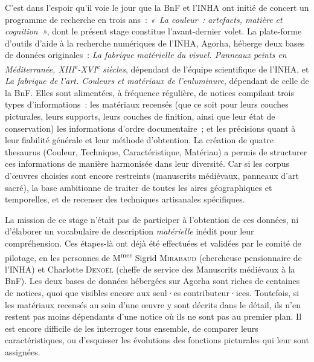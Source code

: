 \documentclass[a4paper,12pt, twoside]{book}
\begin{document}
C’est dans l’espoir qu’il voie le jour que la BnF et l’INHA ont initié de concert un programme de recherche en trois ans~: \textit{«~La couleur~: artefacts, matière et cognition~»}, dont le présent stage constitue l’avant-dernier volet. La plate-forme d’outils d’aide à la recherche numériques de l’INHA, Agorha, héberge deux bases de données originales~: \textit{La fabrique matérielle du visuel. Panneaux peints en Méditerranée, XIII\textsuperscript{e}-XVI\textsuperscript{e} siècles}, dépendant de l’équipe scientifique de l’INHA, et \textit{La fabrique de l'art. Couleurs et matériaux de l'enluminure}, dépendant de celle de la BnF. Elles sont alimentées, à fréquence régulière, de notices compilant trois types d’informations~: les matériaux recensés (que ce soit pour leurs couches picturales, leurs supports, leurs couches de finition, ainsi que leur état de conservation) les informations d’ordre documentaire~; et les précisions quant à leur fiabilité générale et leur méthode d’obtention. La création de quatre thesaurus (\textsf{Couleur, Technique, Caractéristique, Matériau}) a permis de structurer ces informations de manière harmonisée dans leur diversité. Car si les corpus d’œuvres choisies sont encore restreints (manuscrits médiévaux, panneaux d’art sacré), la base ambitionne de traiter de toutes les aires géographiques et temporelles, et de recenser des techniques artisanales spécifiques.

La mission de ce stage n’était pas de participer à l’obtention de ces données, ni d’élaborer un vocabulaire de description \textit{matérielle} inédit pour leur compréhension. Ces étapes-là ont déjà été effectuées et validées par le comité de pilotage, en les personnes de M\textsuperscript{mes} Sigrid \textsc{Mirabaud} (chercheuse pensionnaire de l’INHA) et Charlotte \textsc{Denoël} (cheffe de service des Manuscrits médiévaux à la BnF). Les deux bases de données hébergées sur Agorha sont riches de centaines de notices, quoi que visibles encore aux seul·es contributeur·ices. Toutefois, si les matériaux recensés au sein d’une œuvre y sont décrits dans le détail, ils n’en restent pas moins dépendants d’une notice où ils ne sont pas au premier plan. Il est encore difficile de les interroger tous ensemble, de comparer leurs caractéristiques, ou d’esquisser les évolutions des fonctions picturales qui leur sont assignées.
\end{document}
